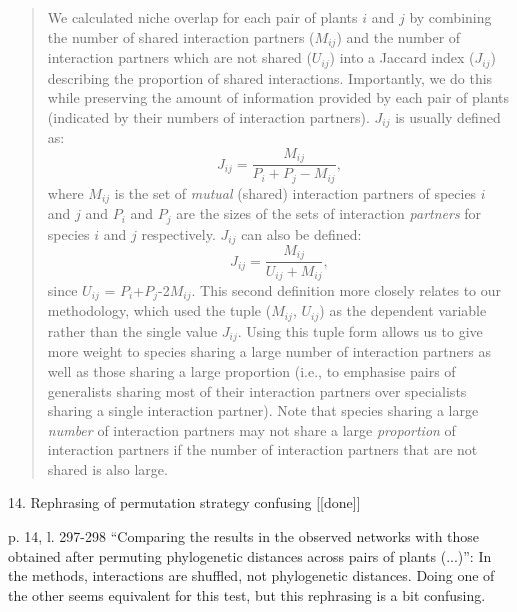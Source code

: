 \documentclass[12pt]{letter}
\newenvironment{refquote}{\bigskip \begin{it}}{\end{it}\smallskip}
\begin{document}
	\begin{quotation}
	    We calculated niche overlap for each pair of plants $i$ and $j$ by 
	    combining the number of shared interaction
	    partners ($M_{ij}$) and the number of interaction partners which are not
	    shared ($U_{ij}$) into a Jaccard index ($J_{ij}$) describing 
	    the proportion of shared interactions. Importantly, we do this while 
	    preserving the amount of information provided by each pair of plants
	    (indicated by their numbers of interaction partners). $J_{ij}$ is usually defined as: 
	    \begin{equation}
	      J_{ij} = \frac{M_{ij}}{P_i+P_j-M_{ij}} ,
	    \end{equation}
	    where $M_{ij}$ is the set of \emph{mutual} (shared) interaction partners of 
	    species $i$ and $j$ and $P_i$ and $P_j$ are the sizes of the sets of interaction 
	    \emph{partners} for species $i$ and $j$ respectively. $J_{ij}$ can also be defined:
	    \begin{equation}
	      J_{ij} = \frac{M_{ij}}{U_{ij}+M_{ij}} ,
	    \end{equation}
	    since $U_{ij}$ = $P_{i}$+$P_{j}$-2$M_{ij}$. This second definition more closely
	    relates to our methodology, which used the tuple ($M_{ij}$, $U_{ij}$) as the
	    dependent variable rather than the single value $J_{ij}$. Using this tuple form
	    allows us to give more 
	    weight to species sharing a large number of interaction partners as well as 
	    those sharing a large proportion (i.e., to emphasise pairs of generalists 
	    sharing most of their interaction partners over specialists sharing a single 
	    interaction partner). Note that species sharing a large \emph{number} of interaction partners may not share a large \emph{proportion} of interaction partners if the number of interaction partners that are not shared is also large. %
	    \end{quotation}


14. Rephrasing of permutation strategy confusing [[done]]
	
	\begin{refquote}
		p. 14, l. 297-298 “Comparing the results in the observed networks with those obtained after permuting phylogenetic distances across pairs of plants (...)”: In the methods, interactions are shuffled, not phylogenetic distances. Doing one of the other seems equivalent for this test, but this rephrasing is a bit confusing.
	\end{refquote}
\end{document}
